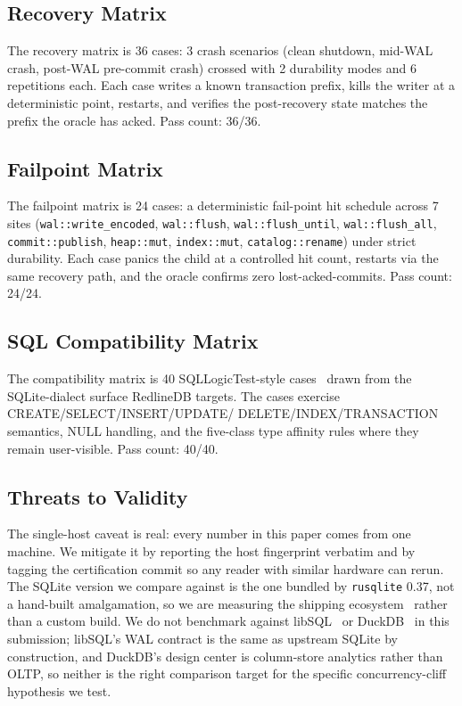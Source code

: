 \subsection{Recovery Matrix}
The recovery matrix is 36 cases: 3 crash scenarios (clean shutdown,
mid-WAL crash, post-WAL pre-commit crash) crossed with 2 durability
modes and 6 repetitions each. Each case writes a known transaction
prefix, kills the writer at a deterministic point, restarts, and
verifies the post-recovery state matches the prefix the oracle has
acked. Pass count: 36/36.

\subsection{Failpoint Matrix}
The failpoint matrix is 24 cases: a deterministic fail-point hit
schedule across 7 sites
(\texttt{wal::write\_encoded}, \texttt{wal::flush},
\texttt{wal::flush\_until}, \texttt{wal::flush\_all},
\texttt{commit::publish}, \texttt{heap::mut}, \texttt{index::mut},
\texttt{catalog::rename}) under strict durability. Each case panics
the child at a controlled hit count, restarts via the same recovery
path, and the oracle confirms zero lost-acked-commits. Pass count:
24/24.

\subsection{SQL Compatibility Matrix}
The compatibility matrix is 40 SQLLogicTest-style
cases~\cite{sqllogictest} drawn from the SQLite-dialect surface
RedlineDB targets. The cases exercise CREATE/SELECT/INSERT/UPDATE/
DELETE/INDEX/TRANSACTION semantics, NULL handling, and the
five-class type affinity rules where they remain user-visible.
Pass count: 40/40.

\subsection{Threats to Validity}
The single-host caveat is real: every number in this paper comes
from one machine. We mitigate it by reporting the host fingerprint
verbatim and by tagging the certification commit so any reader with
similar hardware can rerun. The SQLite version we compare against is
the one bundled by \texttt{rusqlite} 0.37, not a hand-built
amalgamation, so we are measuring the shipping
ecosystem~\cite{rusqlite} rather than a custom build. We do not
benchmark against libSQL~\cite{libsql} or DuckDB~\cite{raasveldt2019duckdb}
in this submission; libSQL's WAL contract is the same as upstream
SQLite by construction, and DuckDB's design center is column-store
analytics rather than OLTP, so neither is the right comparison
target for the specific concurrency-cliff hypothesis we test.

